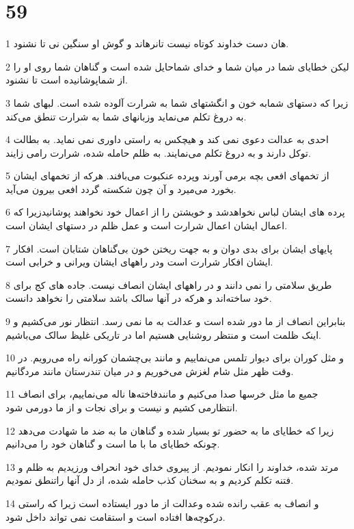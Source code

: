\chapter{59}

\par 1 هان دست خداوند کوتاه نیست تانرهاند و گوش او سنگین نی تا نشنود.
\par 2 لیکن خطایای شما در میان شما و خدای شماحایل شده است و گناهان شما روی او را از شماپوشانیده است تا نشنود.
\par 3 زیرا که دستهای شمابه خون و انگشتهای شما به شرارت آلوده شده است. لبهای شما به دروغ تکلم می‌نماید وزبانهای شما به شرارت تنطق می‌کند.
\par 4 احدی به عدالت دعوی نمی کند و هیچکس به راستی داوری نمی نماید. به بطالت توکل دارند و به دروغ تکلم می‌نمایند. به ظلم حامله شده، شرارت رامی زایند.
\par 5 از تخمهای افعی بچه برمی آورند وپرده عنکبوت می‌بافند. هرکه از تخمهای ایشان بخورد می‌میرد و آن چون شکسته گردد افعی بیرون می‌آید.
\par 6 پرده های ایشان لباس نخواهدشد و خویشتن را از اعمال خود نخواهند پوشانیدزیرا که اعمال ایشان اعمال شرارت است و عمل ظلم در دستهای ایشان است.
\par 7 پایهای ایشان برای بدی دوان و به جهت ریختن خون بی‌گناهان شتابان است. افکار ایشان افکار شرارت است ودر راههای ایشان ویرانی و خرابی است.
\par 8 طریق سلامتی را نمی دانند و در راههای ایشان انصاف نیست. جاده های کج برای خود ساخته‌اند و هر‌که در آنها سالک باشد سلامتی را نخواهد دانست.
\par 9 بنابراین انصاف از ما دور شده است و عدالت به ما نمی رسد. انتظار نور می‌کشیم و اینک ظلمت است و منتظر روشنایی هستیم اما در تاریکی غلیظ سالک می‌باشیم.
\par 10 و مثل کوران برای دیوار تلمس می‌نماییم و مانند بی‌چشمان کورانه راه می‌رویم. در وقت ظهر مثل شام لغزش می‌خوریم و در میان تندرستان مانند مردگانیم.
\par 11 جمیع ما مثل خرسها صدا می‌کنیم و مانندفاخته‌ها ناله می‌نماییم، برای انصاف انتظارمی کشیم و نیست و برای نجات و از ما دورمی شود.
\par 12 زیرا که خطایای ما به حضور تو بسیار شده و گناهان ما به ضد ما شهادت می‌دهد چونکه خطایای ما با ما است و گناهان خود را می‌دانیم.
\par 13 مرتد شده، خداوند را انکار نمودیم. از پیروی خدای خود انحراف ورزیدیم به ظلم و فتنه تکلم کردیم و به سخنان کذب حامله شده، از دل آنها راتنطق نمودیم.
\par 14 و انصاف به عقب رانده شده وعدالت از ما دور ایستاده است زیرا که راستی درکوچه‌ها افتاده است و استقامت نمی تواند داخل شود.
